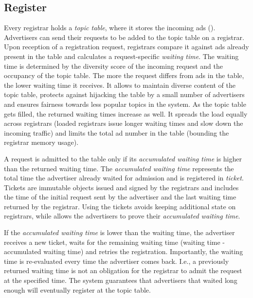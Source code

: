 \subsection{Register}
Every registrar holds a \emph{topic table}, where it stores the incoming ads (). Advertisers can send their requests to be added to the topic table on a registrar. Upon reception of a registration request, registrars compare it against ads already present in the table and calculates a request-specific \emph{waiting time}. The waiting time is determined by the diversity score of the incoming request and the occupancy of the topic table.  The more the request differs from ads in the table, the lower waiting time it receives. It allows to maintain diverse content of the topic table, protects against hijacking the table by a small number of advertisers and ensures fairness towards less popular topics in the system. As the topic table gets filled, the returned waiting times increase as well. It spreads the load equally across registrars (loaded registrars issue longer waiting times and slow down the incoming traffic) and limits the total ad number in the table (bounding the registrar memory usage). 

A request is admitted to the table only if its \emph{accumulated waiting time} is higher than the returned waiting time. The \emph{accumulated waiting time} represents the total time the advertiser already waited for admission and is registered in \emph{ticket}. Tickets are immutable objects issued and signed by the registrars and includes the time of the initial request sent by the advertiser and the last waiting time returned by the registrar. Using the tickets avoids keeping additional state on registrars, while allows the advertisers to prove their \emph{accumulated waiting time}. 

If the \emph{accumulated waiting time} is lower than the waiting time, the advertiser receives a new ticket, waits for the remaining waiting time (waiting time - accumulated waiting time) and retries the registration. Importantly, the waiting time is re-evaluated every time the advertiser comes back. I.e., a previously returned waiting time is not an obligation for the registrar to admit the request at the specified time. The system guarantees that advertisers that waited long enough will eventually register at the topic table. 





